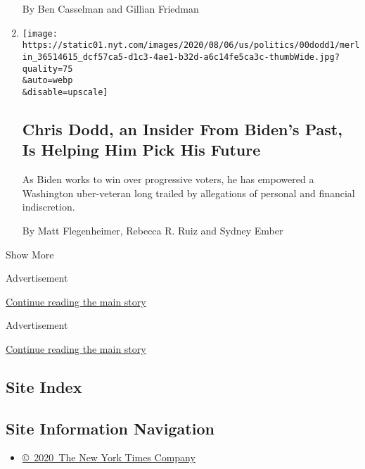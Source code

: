 \begin{enumerate}
  By Ben Casselman and Gillian Friedman
\item
  \href{/2020/08/08/us/politics/biden-vp-chris-dodd.html}{}

  \texttt{[image: https://static01.nyt.com/images/2020/08/06/us/politics/00dodd1/merlin\_36514615\_dcf57ca5-d1c3-4ae1-b32d-a6c14fe5ca3c-thumbWide.jpg?quality=75\\\&auto=webp\\\&disable=upscale]}

  \hypertarget{chris-dodd-an-insider-from-bidens-past-is-helping-him-pick-his-future}{%
  \subsection{Chris Dodd, an Insider From Biden's Past, Is Helping Him
  Pick His
  Future}\label{chris-dodd-an-insider-from-bidens-past-is-helping-him-pick-his-future}}

  As Biden works to win over progressive voters, he has empowered a
  Washington uber-veteran long trailed by allegations of personal and
  financial indiscretion.

  By Matt Flegenheimer, Rebecca R. Ruiz and Sydney Ember
\end{enumerate}

Show More

Advertisement

\protect\hyperlink{after-mid2}{Continue reading the main story}

Advertisement

\protect\hyperlink{after-mktg}{Continue reading the main story}

\hypertarget{site-index}{%
\subsection{Site Index}\label{site-index}}

\hypertarget{site-information-navigation}{%
\subsection{Site Information
Navigation}\label{site-information-navigation}}

\begin{itemize}
\tightlist
\item
  \href{https://help.nytimes.com/hc/en-us/articles/115014792127-Copyright-notice}{©~2020~The
  New York Times Company}
\end{itemize}

